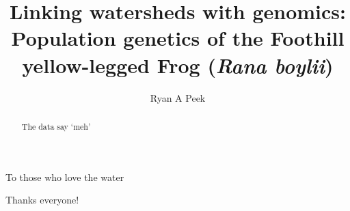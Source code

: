 \documentclass[twoside,12pt,final]{ucthesis-CA2012}
\begin{document}
\begin{ucfrontmatter}


  \title{Linking watersheds with genomics: Population genetics of the Foothill
yellow-legged Frog (\emph{Rana boylii})}

  \author{Ryan A Peek}
   
  \othermemberC{} %

	\maketitle
	\approvalpage

    \begin{dedication}

      \vspace*{25ex}
      \begin{center}
      \begin{Large}

        To those who love the water

      \end{Large}
      \end{center}
  \end{dedication}
  \begin{acknowledgements}
    Thanks everyone!
  \end{acknowledgements}
  \begin{abstract}

    The data say `meh'

  \end{abstract}
	\tableofcontents
\end{ucfrontmatter}
\end{document}
